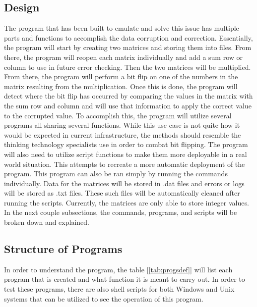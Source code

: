 \documentclass{article}
\begin{document}
\begin{multicols}{2}
    \section{Design}\label{sec:design}
    The program that has been built to emulate and solve this issue has multiple parts and functions to
    accomplish the data corruption and correction. Essentially, the program will start by creating two matrices
    and storing them into files. From there, the program will reopen each matrix individually and add a sum row 
    or column to use in future error checking. Then the two matrices will be multiplied. From there, the program
    will perform a bit flip on one of the numbers in the matrix resulting from the multiplication. Once this is
    done, the program will detect where the bit flip has occurred by comparing the values in the matrix with the
    sum row and column and will use that information to apply the correct value to the corrupted value. To accomplish
    this, the program will utilize several programs all sharing several functions. While this use case is not quite
    how it would be expected in current infrastructure, the methods should resemble the thinking technology specialists
    use in order to combat bit flipping. The program will also need to utilize script functions to make them more
    deployable in a real world situation. This attempts to recreate a more automatic deployment of the program. This
    program can also be ran simply by running the commands individually. Data for the matrices will be stored in .dat 
    files and errors or logs will be stored as .txt files. These such files will be automatically cleaned after running
    the scripts. Currently, the matrices are only able to store integer values. In the next couple subsections, the
    commands, programs, and scripts will be broken down and explained.

    \subsection{Structure of Programs}\label{subsec:programstructs}

    In order to understand the program, the table [\ref{tab:progsdef}] will list each program that is created and what function it is 
    meant to carry out. In order to test these programs, there are also shell scripts for both Windows and Unix systems that can be
    utilized to see the operation of this program.


\end{multicols}
\end{document}
